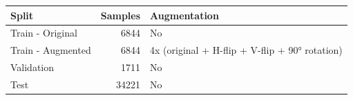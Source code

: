 \begin{tabular}{lrl}
\toprule
Split & Samples & Augmentation \\
\midrule
Train - Original & 6844 & No \\
Train - Augmented & 6844 & 4x (original + H-flip + V-flip + 90° rotation) \\
Validation & 1711 & No \\
Test & 34221 & No \\
\bottomrule
\end{tabular}
